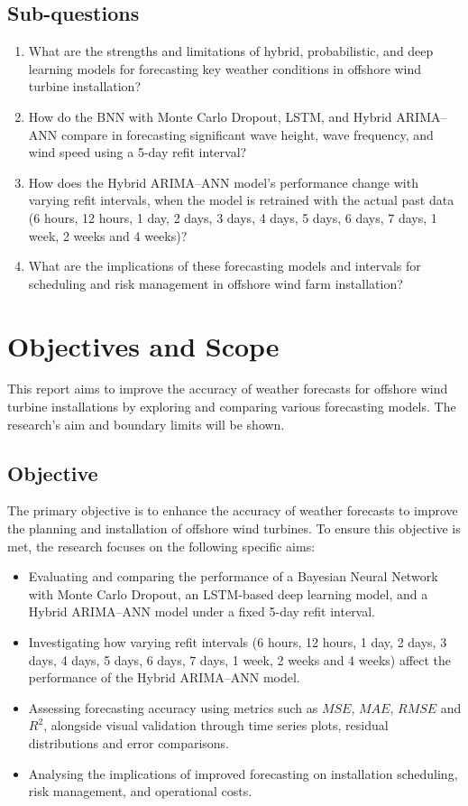 \subsection*{Sub-questions}
\begin{enumerate}
    \item What are the strengths and limitations of hybrid, probabilistic, and deep learning models for forecasting key weather conditions in offshore wind turbine installation?
    \item How do the BNN with Monte Carlo Dropout, LSTM, and Hybrid ARIMA–ANN compare in forecasting significant wave height, wave frequency, and wind speed using a 5-day refit interval?
    \item How does the Hybrid ARIMA–ANN model’s performance change with varying refit intervals, when the model is retrained with the actual past data (6 hours, 12 hours, 1 day, 2 days, 3 days, 4 days, 5 days, 6 days, 7 days, 1 week, 2 weeks and 4 weeks)?
    \item What are the implications of these forecasting models and intervals for scheduling and risk management in offshore wind farm installation?
\end{enumerate}

\section{Objectives and Scope}
This report aims to improve the accuracy of weather forecasts for offshore wind turbine installations by exploring and comparing various forecasting models. The research's aim and boundary limits will be shown.

\subsection*{Objective}
The primary objective is to enhance the accuracy of weather forecasts to improve the planning and installation of offshore wind turbines. To ensure this objective is met, the research focuses on the following specific aims:

\begin{itemize}
    \item Evaluating and comparing the performance of a Bayesian Neural Network with Monte Carlo Dropout, an LSTM-based deep learning model, and a Hybrid ARIMA–ANN model under a fixed 5-day refit interval. 
    \item Investigating how varying refit intervals (6 hours, 12 hours, 1 day, 2 days, 3 days, 4 days, 5 days, 6 days, 7 days, 1 week, 2 weeks and 4 weeks) affect the performance of the Hybrid ARIMA–ANN model. 
    \item Assessing forecasting accuracy using metrics such as $MSE$, $MAE$, $RMSE$ and $R^2$, alongside visual validation through time series plots, residual distributions and error comparisons.
    \item Analysing the implications of improved forecasting on installation scheduling, risk management, and operational costs.
\end{itemize}

